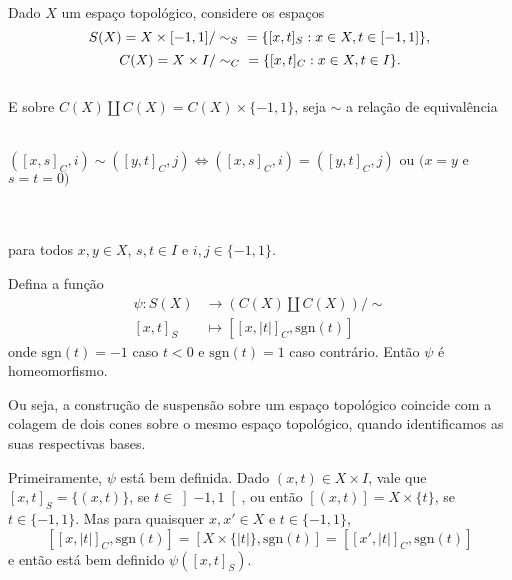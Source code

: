 \begin{prop}
	Dado $X$ um espaço topológico, considere os espaços
    \[S(X) = X\times[-1,1]/\sim_S\hspace{6 pt} = \{[x,t]_S : x\in X, t\in [-1,1]\},\]
    \[C(X) = X\times I/\sim_C\hspace{6 pt} = \{[x,t]_C : x\in X, t\in I\}.\]
    \\
    \noindent E sobre $C(X) \amalg C(X) = C(X)\times\{-1,1\}$, seja $\sim$ a relação de equivalência\\
    \\ \centerline{
    $([x,s]_C,i) \sim ([y,t]_C,j) \Leftrightarrow ([x,s]_C,i) = ([y,t]_C,j)$ ou $(x=y$ e $s=t=0)$}\\
    \\para todos $x,y \in X$, $s,t \in I$ e $i,j \in \{-1,1\}$.    
    
    Defina a função \begin{align*}
        \psi: S(X) &\rightarrow (C(X) \amalg C(X))/ \sim\\
                [x,t]_S &\mapsto [[x,|t|]_C,\text{sgn}(t)]
    \end{align*}
    onde $\text{sgn}(t) = -1$ caso $t < 0$ e $\text{sgn}(t) = 1$ caso contrário. Então $\psi$ é homeomorfismo.

	Ou seja, a construção de suspensão sobre um espaço topológico coincide com a colagem de dois cones sobre o mesmo espaço topológico, quando identificamos as suas respectivas bases.

    \begin{dem}
        Primeiramente, $\psi$ está bem definida. Dado $(x,t) \in X\times I$, vale que $[x,t]_S = \{(x,t)\}$, se $t \in \left]-1,1\right[$, ou então $[(x,t)] = X\times\{t\}$, se $t \in \{-1,1\}$. Mas para quaisquer $x,x'\in X$ e $t\in \{-1,1\}$,\[
        [[x,|t|]_C,\text{sgn}(t)] =
        [X\times\{|t|\},\text{sgn}(t)] =
        [[x',|t|]_C,\text{sgn}(t)]
        \]
        e então está bem definido $\psi([x,t]_S)$.


\end{dem}
\end{prop}
